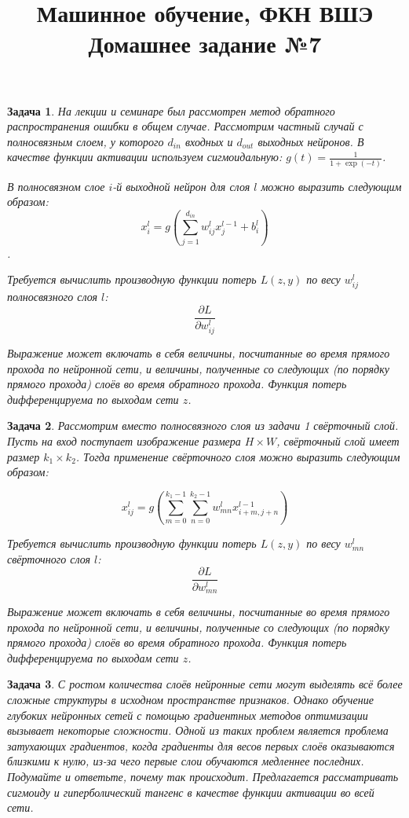 \documentclass[12pt,fleqn]{article}
\title{Машинное обучение, ФКН ВШЭ\\Домашнее задание №7}
\author{}
\date{}
\newtheorem{esProblem}{Задача}
\begin{document}
    \maketitle
    
    \begin{esProblem}
        На лекции и семинаре был рассмотрен метод обратного распространения ошибки в общем случае. Рассмотрим частный случай с полносвязным слоем, у которого $d_{in}$ входных и $d_{out}$ выходных нейронов. В качестве функции активации используем сигмоидальную: $g(t) = \frac{1}{1+\exp(-t)}$. 

        В полносвязном слое $i$-й выходной нейрон для слоя $l$ можно выразить следующим образом: 
        $$x_i^l = g \left( \sum_{j=1}^{d_{in}} w_{ij}^{l} x_{j}^{l-1} + b_i^l \right)$$.

        Требуется вычислить производную функции потерь $L(z, y)$ по весу $w_{ij}^{l}$ полносвязного слоя $l$: 
        $$\frac{\partial L}{\partial w_{ij}^{l}}$$

        Выражение может включать в себя величины, посчитанные во время прямого прохода по нейронной сети, и величины, полученные со следующих (по порядку прямого прохода) слоёв во время обратного прохода. Функция потерь дифференцируема по выходам сети $z$.
    \end{esProblem}


    \begin{esProblem}
        Рассмотрим вместо полносвязного слоя из задачи 1 свёрточный слой. Пусть на вход поступает изображение размера $H \times W$, свёрточный слой имеет размер $k_1 \times k_2$. Тогда применение свёрточного слоя можно выразить следующим образом:

        $$x_{ij}^l = g \left( \sum_{m=0}^{k_1-1} \sum_{n=0}^{k_2-1} w_{mn}^{l} x_{i+m,j+n}^{l-1} \right)$$

        Требуется вычислить производную функции потерь $L(z, y)$ по весу $w_{mn}^{l}$ свёрточного слоя $l$: 
        $$\frac{\partial L}{\partial w_{mn}^{l}}$$

        Выражение может включать в себя величины, посчитанные во время прямого прохода по нейронной сети, и величины, полученные со следующих (по порядку прямого прохода) слоёв во время обратного прохода. Функция потерь дифференцируема по выходам сети $z$.
    \end{esProblem}
    

    \begin{esProblem}
        С ростом количества слоёв нейронные сети могут выделять всё более сложные структуры в исходном пространстве признаков. Однако обучение глубоких нейронных сетей с помощью градиентных методов оптимизации вызывает некоторые сложности. Одной из таких проблем является проблема затухающих градиентов, когда градиенты для весов первых слоёв оказываются близкими к нулю, из-за чего первые слои обучаются медленнее последних. Подумайте и ответьте, почему так происходит. Предлагается рассматривать сигмоиду и гиперболический тангенс в качестве функции активации во всей сети. 
    \end{esProblem}
\end{document}
